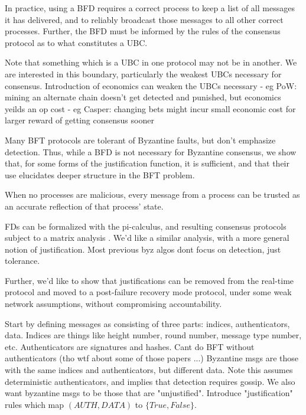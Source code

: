 In practice, using a BFD requires a correct process to keep a list of all messages it has delivered,
and to reliably broadcast those messages to all other correct processes.
Further, the BFD must be informed by the rules of the consensus protocol as to what constitutes a UBC.

Note that something which is a UBC in one protocol may not be in another.
We are interested in this boundary, particularly the weakest UBCs necessary for consensus.
Introduction of economics can weaken the UBCs necessary
	- eg PoW: mining an alternate chain doesn't get detected and punished, but economics yeilds an op cost
	- eg Casper: changing bets might incur small economic cost for larger reward of getting consensus sooner


Many BFT protocols are tolerant of Byzantine faults, but don't emphasize detection.
Thus, while a BFD is not necessary for Byzantine consensus, we show that, for some 
forms of the justification function, it is sufficient,
and that their use elucidates deeper structure in the BFT problem.






When no processes are malicious,
every message from a process can be trusted as an accurate reflection of that process' state.



FDs can be formalized with the pi-calculus, 
and resulting consensus protocols subject to a matrix analysis \cite{nestmann2003modeling}.
We'd like a similar analysis, with a more general notion of justification.
Most previous byz algos dont focus on detection, just tolerance.

Further, we'd like to show that justifications can be removed from the real-time
protocol and moved to a post-failure recovery mode protocol, under some weak network assumptions,
without compromising accountability.

Start by defining messages as consisting of three parts: indices, authenticators, data.
Indices are things like height number, round number, message type number, etc.
Authenticators are signatures and hashes.
Cant do BFT without authenticators (tho wtf about some of those papers ...)
Byzantine msgs are those with the same indices and authenticators, but different data.
Note this assumes deterministic authenticators, and implies that detection requires gossip.
We also want byzantine msgs to be those that are "unjustified".
Introduce "justification" rules which map $(AUTH, DATA)$ to $\{True, False\}$.

